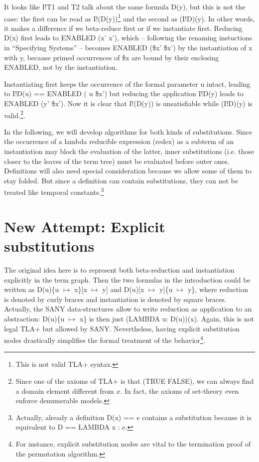 \documentclass[a4paper]{article}
\newcommand{\tlaplus}[0]{{TLA+}}
\newcommand{\tla}[1]{#1}
\begin{document}
\vspace{2mm}
\noindent
It looks like \tla{I!T1} and \tla{T2} talk about the same formula \tla{D(y)},
but this is not the case: the first can be read as \tla{I!(D(y))}\footnote{This
  is not valid \tlaplus{} syntax.} and the second as \tla{(I!D)(y)}. In other
words, it makes a difference if we beta-reduce first or if we instantiate
first. Reducing D(x) first leads to \tla{ENABLED (x' \dif x')}, which --
following the renaming instuctions in ``Specifying Systems'' -- becomes
\tla{ENABLED (\$x' \dif \$x')} by the instantiation of \tla{x} with \tla{y},
because primed occurrences of \tla{\$x} are bound by their enclosing ENABLED,
not by the instantiation.

Instantiating first keeps the occurrence of the  formal parameter \tla{u} intact,
leading to \tla{I!D(u) == ENABLED ( u \dif \$x') } but reducing the application
\tla{I!D(y)} leads to \tla{ENABLED (y' \dif \$x')}. Now it is clear that
\tla{I!(D(y))} is unsatisfiable while \tla{(I!D)(y)} is valid.\footnote{ Since
  one of the axioms  of \tlaplus{} is that (TRUE \dif FALSE), we can always find
  a domain element different from $x$. In fact, the axioms of set-theory even
  enforce denumerable models.}.

In the following, we will develop algorithms for both kinds of substitutions.
Since the occurrence of a lambda reducible expression (redex) as a subterm of
an instantiation may block the evaluation of the latter, inner substitutions
(i.e. those closer to the leaves of the term tree) must be evaluated before
outer ones. Definitions will also need special consideration because
we allow some of them to stay folded. But since a definition can contain
substitutions, they can not be treated like temporal constants.\footnote{
  Actually, already a definition \tla{D(x) == e} contains a substitution
  because it is equivalent to D == LAMBDA x : e.
}

\section{New Attempt: Explicit substitutions}

The original idea here is to represent both beta-reduction and instantiation
explicitly in the term graph. Then the two formulas in the introduction
could be written as D(u)\{u $\mapsto$ x\}[x $\mapsto$ y] and
D(u)[x $\mapsto$ y]\{u $\mapsto$ y\}, where reduction is denoted by curly
braces and instantiation is denoted by square braces. Actually, the SANY
data-structures allow to write reduction as application to an abstraction:
D(u)\{u $\mapsto$ x\} is then just \tla{(LAMBDA u: D(u))(x)}. Again, this
is not legal \tlaplus{} but allowed by SANY. Nevertheless, having explicit
substitution nodes drastically simplifies the formal treatment of the
behavior\footnote{For instance, explicit substitution nodes are vital to the
  termination proof of the permutation algorithm.
}.
\end{document}
